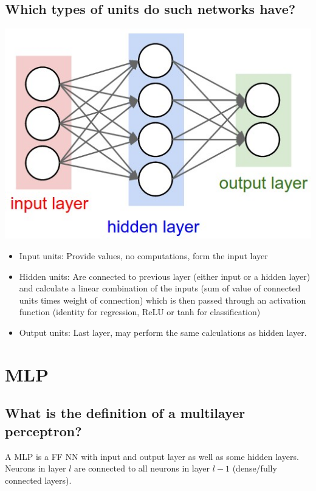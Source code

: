 \subsection{Which types of units do such networks have?}
\begin{minipage}{0.3\textwidth}
\includegraphics[width=\textwidth]{./img/ffnn1.jpeg}
\end{minipage}
\begin{minipage}{0.7\textwidth}
\begin{itemize}
\item Input units: Provide values, no computations, form the input layer
\item Hidden units: Are connected to previous layer (either input or a hidden layer) and calculate a linear combination of the inputs (sum of value of connected units times weight of connection) which is then passed through an activation function (identity for regression, ReLU or tanh for classification)
\item Output units: Last layer, may perform the same calculations as hidden layer.
\end{itemize}
\end{minipage}
%
\section{MLP}
\subsection{What is the definition of a multilayer perceptron?}
A MLP is a FF NN with input and output layer as well as some hidden layers. Neurons in layer $l$ are connected to all neurons in layer $l-1$ (dense/fully connected layers).
